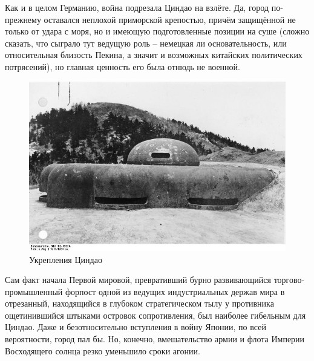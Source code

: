 Как и в целом Германию, война подрезала Циндао на взлёте. Да, город по-прежнему оставался неплохой приморской крепостью, причём защищённой не только от удара с моря, но и имеющую подготовленные позиции на суше (сложно сказать, что сыграло тут ведущую роль – немецкая ли основательность, или относительная близость Пекина, а значит и возможных китайских политических потрясений), но главная ценность его была отнюдь не военной. 


\begin{figure}[h!tb] 
	\centering\includegraphics[scale=0.4]{Glava3/ZqmLdol8HWM.jpg}
	\caption{Укрепления Циндао}%
\end{figure}

Сам факт начала Первой мировой, превративший бурно развивающийся торгово-промышленный форпост одной из ведущих индустриальных держав мира в отрезанный, находящийся в глубоком стратегическом тылу у противника ощетинившийся штыками островок сопротивления, был наиболее гибельным для Циндао. Даже и безотносительно вступления в войну Японии, по всей вероятности, город пал бы. Но, конечно, вмешательство армии и флота Империи Восходящего солнца резко уменьшило сроки агонии.


